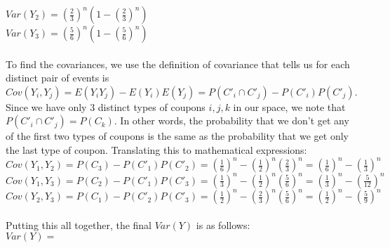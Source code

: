\documentclass{article}
\begin{document}
{$Var(Y_2) = (\frac{2}{3})^n(1-(\frac{2}{3})^n)$ \\
$Var(Y_3) = (\frac{5}{6})^n(1-(\frac{5}{6})^n)$ \\ \\
To find the covariances, we use the definition of covariance that tells us for each distinct pair of events is $Cov(Y_i, Y_j) = E(Y_i Y_j) - E(Y_i)E(Y_j) = P(C'_i \cap C'_j) - P(C'_i)P(C'_j)$. Since we have only 3 distinct types of coupons $i, j, k$ in our space, we note that $P(C'_i \cap C'_j) = P(C_k)$. In other words, the probability that we don't get any of the first two types of coupons is the same as the probability that we get only the last type of coupon. Translating this to mathematical expressions: \\
$Cov(Y_1, Y_2) = P(C_3) - P(C'_1)P(C'_2) = (\frac{1}{6})^n - (\frac{1}{2})^n(\frac{2}{3})^n = (\frac{1}{6})^n - (\frac{1}{3})^n$ \\
$Cov(Y_1, Y_3) = P(C_2) - P(C'_1)P(C'_3) = (\frac{1}{3})^n - (\frac{1}{2})^n(\frac{5}{6})^n = (\frac{1}{3})^n - (\frac{5}{12})^n$ \\
$Cov(Y_2, Y_3) = P(C_1) - P(C'_2)P(C'_3) = (\frac{1}{2})^n - (\frac{2}{3})^n(\frac{5}{6})^n = (\frac{1}{2})^n - (\frac{5}{9})^n$ \\ \\ 
Putting this all together, the final $Var(Y)$ is as follows: \\
$Var(Y) = $  \\

}
\end{document}
